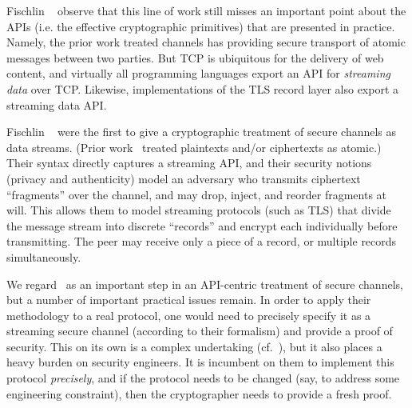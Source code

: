 Fischlin \etal~\cite{FPMG15} observe that this line of work still
misses an important point about the APIs (i.e. the effective cryptographic
primitives) that are presented in practice.  Namely, the prior work treated
channels has providing secure transport of atomic messages between two parties.
%
%
But TCP is ubiquitous for the delivery of web content, and virtually
all programming languages export an API for \emph{streaming data} over
TCP.  Likewise, implementations of
the TLS record layer also export a streaming data API. 
%
Fischlin \etal~\cite{FPMG15} were the first to give a cryptographic
treatment of secure channels as data streams. (Prior
work~\cite{BDPS12, BFK+13,DLFK+17} treated plaintexts and/or
ciphertexts as atomic.)
%
Their syntax directly captures a streaming API, and their security notions
(privacy and authenticity) model an adversary who transmits ciphertext
``fragments'' over the channel, and may drop, inject, and reorder fragments at
will.  This allows them to model streaming protocols (such as TLS) that divide
the message stream into discrete ``records'' and encrypt each individually
before transmitting. The peer may receive only a piece of a record, or multiple
records simultaneously.

We regard~\cite{FPMG15} as an important step in an API-centric
treatment of secure channels, but a number of important practical
issues remain.
%
In order to apply their methodology to a real protocol, one would need to
precisely specify it as a streaming secure channel (according to their
formalism) and provide a proof of security. This on its own is a complex
undertaking (cf.~\cite{DLFK+17}), but it also places a heavy burden on security
engineers. It is incumbent on them to implement this protocol \emph{precisely},
and if the protocol needs to be changed (say, to address some engineering
constraint), then the cryptographer needs to provide a fresh proof.

